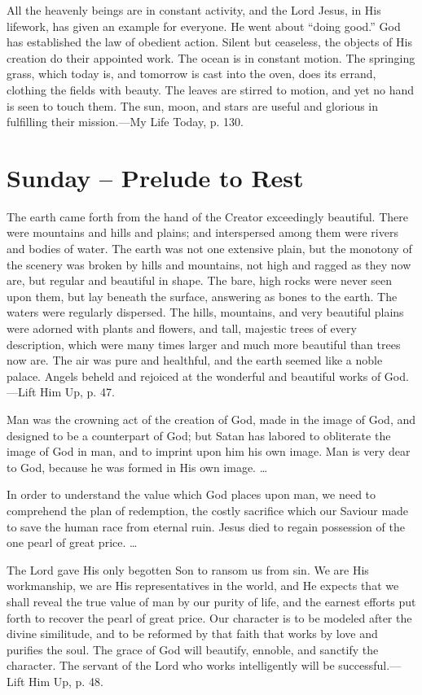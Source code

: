 \documentclass[a4paper, 10pt, twoside, headings=small]{scrartcl}
\begin{document}
\begin{multicols}{2}
All the heavenly beings are in constant activity, and the Lord Jesus, in His lifework, has given an example for everyone. He went about “doing good.” God has established the law of obedient action. Silent but ceaseless, the objects of His creation do their appointed work. The ocean is in constant motion. The springing grass, which today is, and tomorrow is cast into the oven, does its errand, clothing the fields with beauty. The leaves are stirred to motion, and yet no hand is seen to touch them. The sun, moon, and stars are useful and glorious in fulfilling their mission.—My Life Today, p. 130.

\section*{Sunday – Prelude to Rest}

The earth came forth from the hand of the Creator exceedingly beautiful. There were mountains and hills and plains; and interspersed among them were rivers and bodies of water. The earth was not one extensive plain, but the monotony of the scenery was broken by hills and mountains, not high and ragged as they now are, but regular and beautiful in shape. The bare, high rocks were never seen upon them, but lay beneath the surface, answering as bones to the earth. The waters were regularly dispersed. The hills, mountains, and very beautiful plains were adorned with plants and flowers, and tall, majestic trees of every description, which were many times larger and much more beautiful than trees now are. The air was pure and healthful, and the earth seemed like a noble palace. Angels beheld and rejoiced at the wonderful and beautiful works of God.—Lift Him Up, p. 47.

Man was the crowning act of the creation of God, made in the image of God, and designed to be a counterpart of God; but Satan has labored to obliterate the image of God in man, and to imprint upon him his own image. Man is very dear to God, because he was formed in His own image. …

In order to understand the value which God places upon man, we need to comprehend the plan of redemption, the costly sacrifice which our Saviour made to save the human race from eternal ruin. Jesus died to regain possession of the one pearl of great price. …

The Lord gave His only begotten Son to ransom us from sin. We are His workmanship, we are His representatives in the world, and He expects that we shall reveal the true value of man by our purity of life, and the earnest efforts put forth to recover the pearl of great price. Our character is to be modeled after the divine similitude, and to be reformed by that faith that works by love and purifies the soul. The grace of God will beautify, ennoble, and sanctify the character. The servant of the Lord who works intelligently will be successful.—Lift Him Up, p. 48.


\end{multicols}
\end{document}
